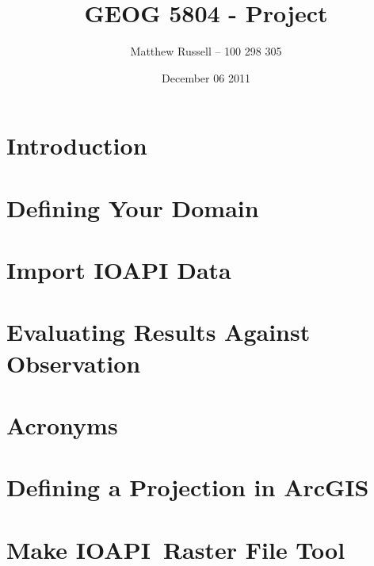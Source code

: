 \documentclass[11pt,letterpaper,twoside]{report}
\title{GEOG 5804 - Project}
\author{Matthew Russell -- 100 298 305}
\date{December 06 2011}
\newcommand{\ioapi}{IOAPI}
\begin{document}





\pagestyle{empty}
\cleardoublepage
{}
\thispagestyle{plain}
\tableofcontents
\cleardoublepage

\pagestyle{plain}
\doublespace
\chapter{Introduction}








\chapter{Defining Your Domain}
\label{define_grids}

\cleardoublepage

\chapter{Import IOAPI Data}
\label{import_ioapi_data}

\cleardoublepage

\chapter{Evaluating Results Against Observation}
\label{eval}

\cleardoublepage

\chapter*{Acronyms}

\cleardoublepage

\appendix
\chapter{Defining a Projection in ArcGIS}
\label{defining_projection}

\cleardoublepage

\chapter{Make \ioapi~Raster File Tool}
\label{ioapi_tool_detail}

\end{document}
